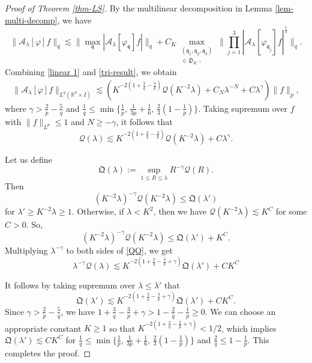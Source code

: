 \documentclass[10pt] %
{amsart}
\theoremstyle{plain}
\numberwithin{equation}{section}
\newcommand{\R}{\mathbb R}
\newcommand{\fq}{\mathfrak q}
\begin{document}
\begin{proof}[Proof of Theorem \ref{thm-LS}]
By the multilinear decomposition in Lemma \ref{lem-multi-decomp}, we have
\begin{equation*}
\big\| \mathcal A_\lambda [\varphi]f \big\|_{q} 
\lesssim 
\big\|\max_{\fq}|\mathcal A_\lambda [\varphi_{\fq}]f|\big\|_{q} + C_K
\max_{\substack{(\fq_1,\fq_2,\fq_3) \\ \in \mathfrak D_{K^{-1}}}}\Big\| \prod_{j=1}^3 |\mathcal A_\lambda [\varphi_{\mathfrak q_j}]f|^{\frac13} \Big\|_{q} .
\end{equation*}
Combining \eqref{linear 1} and \eqref{tri-result}, we obtain
\begin{align*}
\big\| \mathcal A_\lambda [\varphi]f \big\|_{L^q(\R^4\times I)} 
\lesssim ( K^{-2(1+\frac3q-\frac3p)}
\mathscr Q (K^{-2} \lambda)+C_N\lambda^{-N}+ C \lambda^{ \gamma } )\| f\|_p,
\end{align*}
where $\gamma> \frac2 p-\frac 5 q$ and $\frac 1 q \le \min\{ \frac 1p,\, \frac 1{3p}+\frac16,\, \frac23(1-\frac1p) \}$.  
Taking supremum over $f$ with $\|f\|_{L^p}\le 1$ and $N\ge-\gamma$, it follows that 
\begin{equation}\label{QQ}
\mathscr Q(\lambda) \lesssim K^{-2(1+\frac3q-\frac3p)}
\mathscr Q (K^{-2} \lambda)+ C \lambda^{ \gamma }. 
\end{equation}

Let us define
\[
\mathfrak Q(\lambda):=\sup_{1\le R\le \lambda}R^{-\gamma }\mathscr Q(R).
\]
Then 
\[(K^{-2}\lambda)^{-\gamma} \mathscr Q (K^{-2} \lambda)  \le \mathfrak Q (\lambda ')\] for $\lambda' \ge K^{-2} \lambda \ge 1$. 
Otherwise, if $\lambda < K^2$, then we have $ \mathscr Q (K^{-2} \lambda) \lesssim K^C$ for some $C>0$. 
So,  \[(K^{-2}\lambda)^{-\gamma} \mathscr Q (K^{-2} \lambda)  \le \mathfrak Q (\lambda ') + K^C.\] 
Multiplying $\lambda^{-\gamma}$ to both sides of \eqref{QQ}, we get
\[
\lambda^{-\gamma}\mathscr Q(\lambda) \lesssim K^{-2(1+\frac3q-\frac3p +\gamma)}  \mathfrak Q (\lambda') + C   K^C
\]

It follows by taking supremum over $\lambda \le \lambda'$ that 
\[
\mathfrak Q(\lambda') \lesssim K^{-2(1+\frac3q-\frac3p +\gamma)}  \mathfrak Q (\lambda' ) + C K^C. 
\]
Since $\gamma >\frac 2 p -\frac 5 q$, we have  $ 1+\frac3q-\frac3p +\gamma > 1-\frac 2 q - \frac 1 p\ge 0$.
We can choose an appropriate constant $K\ge 1$ so that $K^{-2(1+\frac3q-\frac3p +\gamma)} < 1/2$, which implies   $ \mathfrak Q(\lambda') \lesssim C K^C$ for $\frac 1 q \le \min\{ \frac 1p,\, \frac 1{3p}+\frac16,\, \frac23(1-\frac1p) \}$ and $ \frac 2 q \le 1-\frac 1p  $. 
This completes the proof.  
\end{proof}
\end{document}

